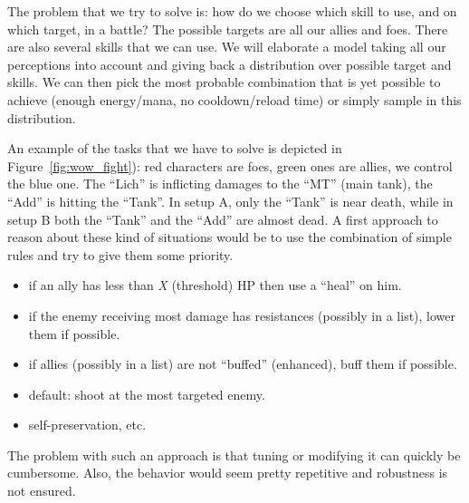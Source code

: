 The problem that we try to solve is: how do we choose which skill to use, and on which target, in a  battle? The possible targets are all our allies and foes. There are also several skills that we can use. We will elaborate a model taking all our perceptions into account and giving back a distribution over possible target and skills. We can then pick the most probable combination that is yet possible to achieve (enough energy/mana, no cooldown/reload time) or simply sample in this distribution. %

An example of the tasks that we have to solve is depicted in Figure~\ref{fig:wow_fight}): red characters are foes, green ones are allies, we control the blue one. The ``Lich'' is inflicting damages to the ``MT'' (main tank), the ``Add'' is hitting the ``Tank''. In setup A, only the ``Tank'' is near death, while in setup B both the ``Tank'' and the ``Add'' are almost dead. A first approach to reason about these kind of situations would be to use the combination of simple rules and try to give them some priority.
\begin{itemize}
    \item if an ally has less than \textit{X} (threshold) HP then use a ``heal'' on him.
    \item if the enemy receiving most damage has resistances (possibly in a list), lower them if possible.
    \item if allies (possibly in a list) are not ``buffed'' (enhanced), buff them if possible.
    \item default: shoot at the most targeted enemy.
    \item self-preservation, etc.
\end{itemize}
The problem with such an approach is that tuning or modifying it can quickly be cumbersome. Also, the behavior would seem pretty repetitive and robustness is not ensured.

